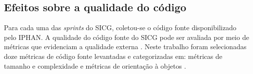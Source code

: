 \begin{figure}[h]
\end{figure}



\subsection[Efeitos sobre a qualidade do código]{Efeitos sobre a qualidade do código}

Para cada uma das \textit{sprints} do SICG, coletou-se o código fonte disponibilizado pelo IPHAN. A qualidade do código fonte do SICG pode ser avaliada por meio de métricas que evidenciam a qualidade externa \cite{ISO25023}. Neste trabalho foram selecionadas doze métricas de código fonte levantadas e categorizadas em: métricas de tamanho e complexidade e métricas de orientação à objetos \cite{Meirelles2013}. 


